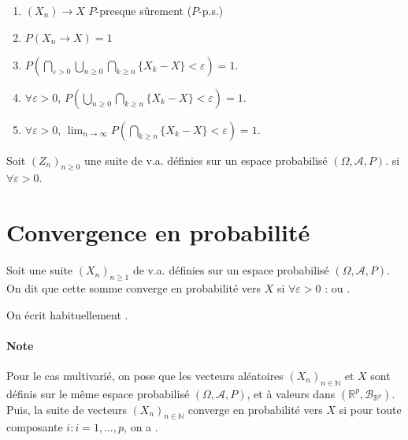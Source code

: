 \documentclass[10pt, french]{report}
\begin{document}
\begin{multicols*}{2}
\begin{definitionNOHFILLprop}
\begin{enumerate}[label = \circled{\arabic*}{trueblue}]
	\item	$(X_{n}) \rightarrow X$ $P$-presque sûrement ($P$-p.s.)
	\item	$P(X_{n} \rightarrow X) = 1$
	\item	$\displaystyle P\left(\bigcap_{\varepsilon > 0}\bigcup_{n \geq 0}\bigcap_{k \geq n} \{X_{k} - X\} < \varepsilon\right) = 1$.
	\item	$\forall \varepsilon > 0$, $\displaystyle P\left(\bigcup_{n \geq 0}\bigcap_{k \geq n} \{X_{k} - X\} < \varepsilon\right) = 1$.
	\item	$\forall \varepsilon > 0$, $\displaystyle \lim_{n \rightarrow \infty}P\left(\bigcap_{k \geq n} \{X_{k} - X\} < \varepsilon\right) = 1$.
\end{enumerate}
\end{definitionNOHFILLprop}

\begin{definitionNOHFILLprop}
Soit $(Z_{n})_{n \geq 0}$ une suite de v.a. définies sur un espace probabilisé $(\Omega, \mathcal{A}, P)$.  si  $\forall \varepsilon > 0$.
\end{definitionNOHFILLprop}


\columnbreak
\section{Convergence en probabilité}
\begin{definitionNOHFILL}
Soit une suite $(X_{n})_{n \geq 1}$ de v.a. définies sur un espace probabilisé $(\Omega, \mathcal{A}, P)$. On dit que cette somme converge en probabilité vers $X$ si $\forall \varepsilon > 0$ :  ou . 

\bigskip

On écrit habituellement .

\paragraph{Note}	Pour le cas multivarié, on pose que les vecteurs aléatoires $(X_{n})_{n \in \mathbb{N}}$ et $X$ sont définis sur le même espace probabilisé $(\Omega, \mathcal{A}, P)$, et à valeurs dans $(\mathbb{R}^{p}, \mathcal{B}_{\mathbb{R}^{p}})$. Puis, la suite de vecteurs $(X_{n})_{n \in \mathbb{N}}$ converge en probabilité vers $X$ si pour toute composante $i : i = 1, \dots, p$, on a .
\end{definitionNOHFILL}


\end{multicols*}
\end{document}
